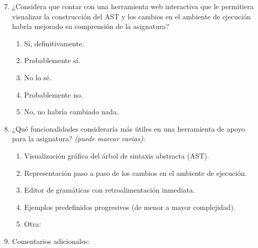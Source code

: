 \begin{enumerate}
    \setcounter{enumi}{6}

    \item ¿Considera que contar con una herramienta web interactiva que le permitiera visualizar la construcción del AST y los cambios en el ambiente de ejecución habría mejorado su comprensión de la asignatura?
    \begin{enumerate}
        \item Sí, definitivamente.
        \item Probablemente sí.
        \item No lo sé.
        \item Probablemente no.
        \item No, no habría cambiado nada.
    \end{enumerate}

    \item ¿Qué funcionalidades consideraría más útiles en una herramienta de apoyo para la asignatura? \textit{(puede marcar varias)}:
    \begin{enumerate}
        \item Visualización gráfica del árbol de sintaxis abstracta (AST).
        \item Representación paso a paso de los cambios en el ambiente de ejecución.
        \item Editor de gramáticas con retroalimentación inmediata.
        \item Ejemplos predefinidos progresivos (de menor a mayor complejidad).
        \item Otra: \underline{\hspace{6cm}}
    \end{enumerate}

    \item Comentarios adicionales: \underline{\hspace{12cm}}
\end{enumerate}
